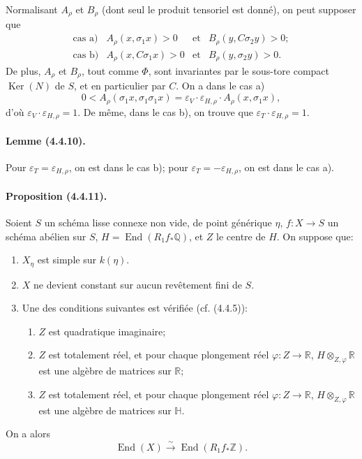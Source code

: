 \documentclass[10pt]{article}
\newcommand{\Q}{\mathbb Q}
\newcommand{\Z}{\mathbb Z}
\newcommand{\Ker}{\operatorname{Ker}}
\newcommand{\iso}{\xrightarrow{\sim}}
\newcommand{\R}{\mathbb R}
\providecommand{\End}{\operatorname{End}}
\begin{document}

Normalisant $A_\rho$ et $B_\rho$ (dont seul le produit tensoriel est donné), on peut supposer que
\[
\begin{array}{llll}
\text{cas a)}& A_\rho(x,\sigma_1x)>0 & \text{et} & B_\rho(y,C\sigma_2y)>0;\\[0.3em]
\text{cas b)}& A_\rho(x,C\sigma_1x)>0 & \text{et} & B_\rho(y,\sigma_2y)>0.
\end{array}
\]
De plus, $A_\rho$ et $B_\rho$, tout comme $\Phi$, sont invariantes par le sous-tore compact $\Ker(N)$ de $S$, et en particulier par $C$. On a dans le cas a)
\[
0<A_\rho(\sigma_1x,\sigma_1\sigma_1x)
=\varepsilon_V\cdot\varepsilon_{H,\rho}\cdot A_\rho(x,\sigma_1x),
\]
d'où $\varepsilon_V\cdot\varepsilon_{H,\rho}=1$. De même, dans le cas b), on trouve que $\varepsilon_T\cdot\varepsilon_{H,\rho}=1$.

\paragraph{Lemme (4.4.10).} Pour $\varepsilon_T=\varepsilon_{H,\rho}$, on est dans le cas b); pour $\varepsilon_T=-\varepsilon_{H,\rho}$, on est dans le cas a).

\paragraph{Proposition (4.4.11).} Soient $S$ un schéma lisse connexe non vide, de point générique $\eta$, $f:X\to S$ un schéma abélien sur $S$, $H=\End(R_1f_*\Q)$, et $Z$ le centre de $H$. On suppose que:
\begin{enumerate}[label=(\alph*)]
\item $X_\eta$ est simple sur $k(\eta)$.
\item $X$ ne devient constant sur aucun revêtement fini de $S$.
\item Une des conditions suivantes est vérifiée (cf. (4.4.5)):
\begin{enumerate}[label=(\ensuremath{c_{\arabic*}})]
\item $Z$ est quadratique imaginaire;
\item $Z$ est totalement réel, et pour chaque plongement réel $\varphi:Z\to\R$, $H\otimes_{Z,\varphi}\R$ est une algèbre de matrices sur $\R$;
\item $Z$ est totalement réel, et pour chaque plongement réel $\varphi:Z\to\R$, $H\otimes_{Z,\varphi}\R$ est une algèbre de matrices sur $\mathbb H$.
\end{enumerate}
\end{enumerate}
On a alors
\[
\End(X)\iso \End(R_1f_*\Z).
\]
\end{document}
